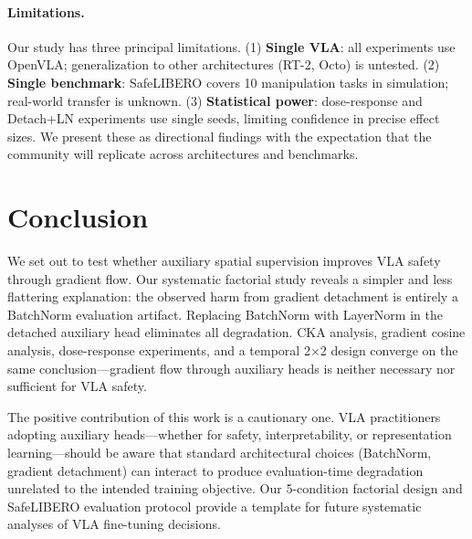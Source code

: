 \documentclass[10pt,letterpaper]{article}
\begin{document}
\paragraph{Limitations.}
Our study has three principal limitations. (1) \textbf{Single VLA}: all experiments use OpenVLA; generalization to other architectures (RT-2, Octo) is untested. (2) \textbf{Single benchmark}: SafeLIBERO covers 10 manipulation tasks in simulation; real-world transfer is unknown. (3) \textbf{Statistical power}: dose-response and Detach+LN experiments use single seeds, limiting confidence in precise effect sizes. We present these as directional findings with the expectation that the community will replicate across architectures and benchmarks.

\section{Conclusion}

We set out to test whether auxiliary spatial supervision improves VLA safety through gradient flow. Our systematic factorial study reveals a simpler and less flattering explanation: the observed harm from gradient detachment is entirely a BatchNorm evaluation artifact. Replacing BatchNorm with LayerNorm in the detached auxiliary head eliminates all degradation. CKA analysis, gradient cosine analysis, dose-response experiments, and a temporal 2$\times$2 design converge on the same conclusion---gradient flow through auxiliary heads is neither necessary nor sufficient for VLA safety.

The positive contribution of this work is a cautionary one. VLA practitioners adopting auxiliary heads---whether for safety, interpretability, or representation learning---should be aware that standard architectural choices (BatchNorm, gradient detachment) can interact to produce evaluation-time degradation unrelated to the intended training objective. Our 5-condition factorial design and SafeLIBERO evaluation protocol provide a template for future systematic analyses of VLA fine-tuning decisions.


\end{document}
